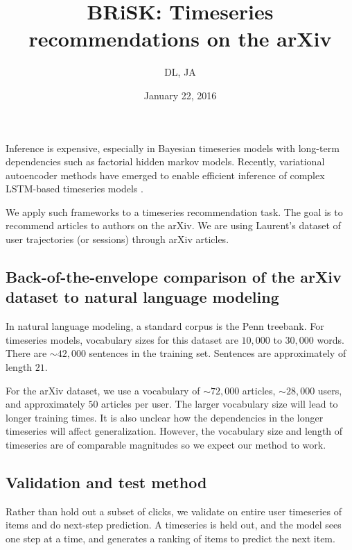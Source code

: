 




\title{BRiSK: Timeseries recommendations on the arXiv}
\author{DL, JA}
\date{January 22, 2016}


\maketitle

Inference is expensive, especially in Bayesian timeseries models with long-term dependencies such as factorial hidden markov models. Recently, variational autoencoder methods \citep{Kingma2014} have emerged to enable efficient inference of complex LSTM-based timeseries models \citep{Bowman2015a}.

We apply such frameworks to a timeseries recommendation task. The goal is to recommend articles to authors on the arXiv. We are using Laurent's dataset of user trajectories (or sessions) through arXiv articles.

\subsection*{Back-of-the-envelope comparison of the arXiv dataset to natural language modeling}

In natural language modeling, a standard corpus is the Penn treebank. For timeseries models, vocabulary sizes for this dataset are $10,000$ to $30,000$ words. There are $\sim42,000$ sentences in the training set. Sentences are approximately of length $21$.

For the arXiv dataset, we use a vocabulary of $\sim72,000$ articles, $\sim 28,000$ users, and approximately $50$ articles per user. The larger vocabulary size will lead to longer training times. It is also unclear how the dependencies in the longer timeseries will affect generalization. However, the vocabulary size and length of timeseries are of comparable magnitudes so we expect our method to work.

\subsection*{Validation and test method}
Rather than hold out a subset of clicks, we validate on entire user timeseries of items and do next-step prediction. A timeseries is held out, and the model sees one step at a time, and generates a ranking of items to predict the next item.

